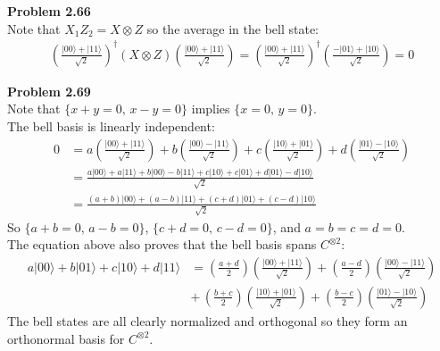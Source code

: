 \documentclass[fleqn]{article}
\newcommand{\problem}[1]{{\large\textbf{Problem #1}}}
\newcommand{\ket}[1]{\ensuremath{| #1 \rangle}}
\begin{document}
\problem{2.66} \\
Note that $X_1Z_2 = X \otimes Z$ so the average in the bell state:
\begin{align*}
  \left(\frac{\ket{00} + \ket{11}}{\sqrt{2}}\right)^{\dagger}(X \otimes Z)\left(\frac{\ket{00} + \ket{11}}{\sqrt{2}}\right)
  = \left(\frac{\ket{00} + \ket{11}}{\sqrt{2}}\right)^{\dagger} \left( \frac{-\ket{01} + \ket{10}}{\sqrt{2}} \right)
  = 0
\end{align*}

\problem{2.69} \\
Note that $\{ x + y = 0, \, x - y = 0 \}$ implies $\{ x = 0, \, y = 0 \}$. \\
The bell basis is linearly independent:
\begin{align*}
  0 &= a \left( \frac{\ket{00} + \ket{11}}{\sqrt{2}} \right) +
       b \left( \frac{\ket{00} - \ket{11}}{\sqrt{2}} \right) +
       c \left( \frac{\ket{10} + \ket{01}}{\sqrt{2}} \right) +
       d \left( \frac{\ket{01} - \ket{10}}{\sqrt{2}} \right) \\
    &= \frac{a\ket{00} + a\ket{11} + b\ket{00} - b\ket{11} +
             c\ket{10} + c\ket{01} + d\ket{01} - d\ket{10}}{\sqrt{2}} \\
    &= \frac{(a + b) \ket{00} + (a - b) \ket{11} + (c + d) \ket{01} + (c - d) \ket{10}}{\sqrt{2}}
\end{align*}
So $\{ a + b = 0, \, a - b = 0 \}$, $\{ c + d = 0, \, c - d = 0 \}$,
and $a = b = c = d = 0$. \\

The equation above also proves that the bell basis spans $C^{\otimes2}$:  \\
\vspace{-1em}
\begin{align*}
  a\ket{00} + b\ket{01} + c\ket{10} + d\ket{11}
  &= \left( \frac{a + d}{2} \right) \left( \frac{\ket{00} + \ket{11}}{\sqrt{2}} \right) +
     \left( \frac{a - d}{2} \right) \left( \frac{\ket{00} - \ket{11}}{\sqrt{2}} \right) \\
  &+ \, \left( \frac{b + c}{2} \right) \left( \frac{\ket{10} + \ket{01}}{\sqrt{2}} \right) +
     \left( \frac{b - c}{2} \right) \left( \frac{\ket{01} - \ket{10}}{\sqrt{2}} \right)
\end{align*}
The bell states are all clearly normalized and orthogonal so they form an
orthonormal basis for $C^{\otimes2}$. \\
\end{document}
